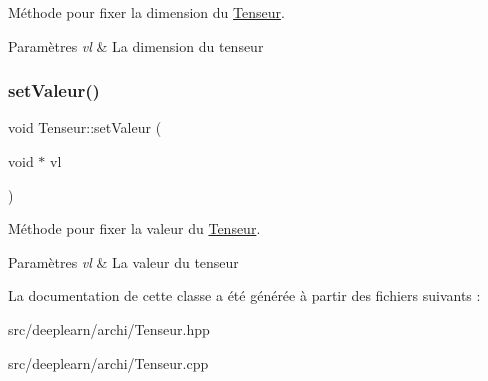 Méthode pour fixer la dimension du \hyperlink{classTenseur}{Tenseur}. 


\begin{DoxyParams}{Paramètres}
{\em vl} & La dimension du tenseur \\
\hline
\end{DoxyParams}
\mbox{\label{classTenseur_add5cd51caa3aae69a44dc3f0bc2b9170}} 
\subsubsection{\texorpdfstring{set\+Valeur()}{setValeur()}}
{\footnotesize\ttfamily void Tenseur\+::set\+Valeur (\begin{DoxyParamCaption}\item[{void $\ast$}]{vl }\end{DoxyParamCaption})}



Méthode pour fixer la valeur du \hyperlink{classTenseur}{Tenseur}. 


\begin{DoxyParams}{Paramètres}
{\em vl} & La valeur du tenseur \\
\hline
\end{DoxyParams}


La documentation de cette classe a été générée à partir des fichiers suivants \+:\begin{DoxyCompactItemize}
\item 
src/deeplearn/archi/Tenseur.\+hpp\item 
src/deeplearn/archi/Tenseur.\+cpp\end{DoxyCompactItemize}
